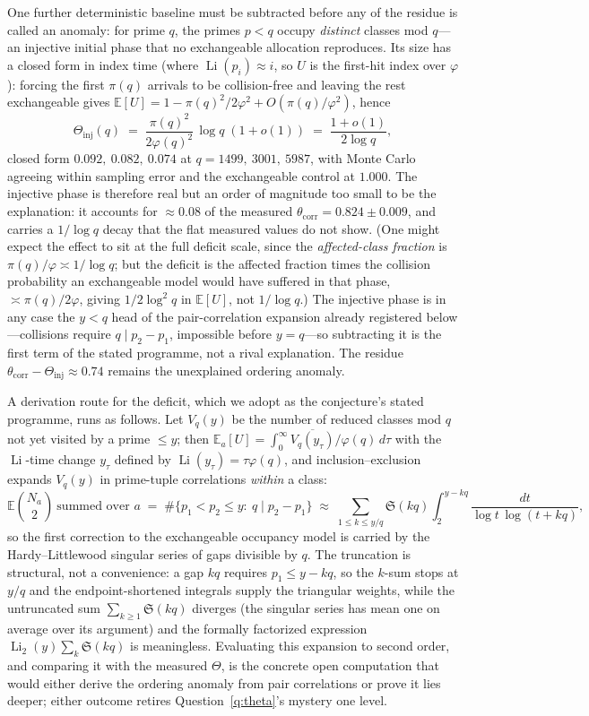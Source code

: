 \documentclass[11pt]{article}
\theoremstyle{definition}
\newcommand{\Li}{\operatorname{Li}}
\newcommand{\SG}{\mathfrak S}
\begin{document}
One further deterministic baseline must be subtracted before any of
the residue is called an anomaly: for prime $q$, the primes $p<q$
occupy
\emph{distinct} classes mod $q$---an injective initial phase that no
exchangeable allocation reproduces.  Its size has a closed form in
index time (where $\Li(p_i)\approx i$, so $U$ is the first-hit index
over $\varphi$): forcing the first $\pi(q)$ arrivals to be
collision-free and leaving the rest exchangeable gives
$\mathbb E[U]=1-\pi(q)^2/2\varphi^2+O(\pi(q)/\varphi^2)$, hence
\[
\Theta_{\mathrm{inj}}(q)
\;=\;\frac{\pi(q)^2}{2\varphi(q)^2}\,\log q\;(1+o(1))
\;=\;\frac{1+o(1)}{2\log q},
\]
closed form $0.092,\ 0.082,\ 0.074$ at $q=1499,\ 3001,\ 5987$, with
Monte Carlo agreeing within sampling error and the exchangeable
control at $1.000$.
The injective phase is therefore real but an order of magnitude too
small to be the explanation: it accounts for ${\approx}0.08$ of the
measured $\theta_{\mathrm{corr}}=0.824\pm0.009$, and carries a
$1/\log q$ decay that the flat measured values do not show.  (One might
expect the effect
to sit at the full deficit scale, since the \emph{affected-class
fraction} is $\pi(q)/\varphi\asymp1/\log q$; but the deficit is the affected
fraction times the collision
probability an exchangeable model would have suffered in that phase,
$\asymp\pi(q)/2\varphi$, giving $1/2\log^2q$ in $\mathbb E[U]$, not
$1/\log q$.)  The injective phase is in any case the $y<q$ head of
the pair-correlation expansion already registered below---collisions
require $q\mid p_2-p_1$, impossible before $y=q$---so subtracting it
is the first term of the stated programme, not a rival explanation.
The residue $\theta_{\mathrm{corr}}-\Theta_{\mathrm{inj}}
\approx0.74$ remains the unexplained ordering anomaly.

A derivation route for the deficit, which we adopt as the conjecture's
stated programme, runs as follows.  Let $V_q(y)$ be the number of reduced
classes mod $q$ not
yet visited by a prime $\le y$; then
$\mathbb E_a[U]=\int_0^\infty \overline{V_q(y_\tau)}/\varphi(q)\,
d\tau$ with the $\Li$-time change $y_\tau$ defined by
$\Li(y_\tau)=\tau\varphi(q)$, and inclusion--exclusion expands
$V_q(y)$ in prime-tuple correlations \emph{within} a class:
\[
\mathbb E\binom{N_a}{2}\ \text{summed over }a
\;=\;\#\{p_1<p_2\le y:\ q\mid p_2-p_1\}
\;\approx\;\sum_{1\le k\le y/q}\SG(kq)
\int_2^{y-kq}\frac{dt}{\log t\,\log(t+kq)},
\]
so the first correction to the exchangeable occupancy model is
carried by the Hardy--Littlewood singular series of gaps divisible by
$q$.  The truncation is structural, not a convenience: a gap $kq$
requires $p_1\le y-kq$, so the $k$-sum stops at $y/q$ and the
endpoint-shortened integrals supply the triangular weights, while the
untruncated sum $\sum_{k\ge1}\SG(kq)$ diverges (the singular series
has mean one on average over its argument) and the formally
factorized expression $\Li_2(y)\sum_k\SG(kq)$ is meaningless.  Evaluating this expansion to second order, and comparing it
with the measured $\Theta$, is the concrete open computation that
would either derive the ordering anomaly from pair correlations or
prove it lies deeper; either outcome retires
Question~\ref{q:theta}'s mystery one level.
\end{document}
